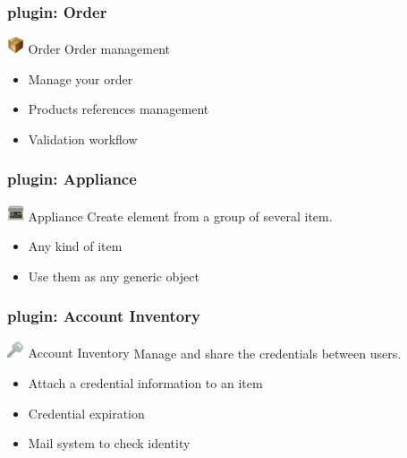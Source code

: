 \documentclass{beamer}
\begin{document}
\begin{frame}
    \frametitle{plugin: Order}

    \begin{block}{\includegraphics[height=0.5cm]{./pics/plugins/order.jpg} Order}
        Order management
        \begin{itemize}
            \item Manage your order
            \item Products references management
            \item Validation workflow
        \end{itemize}
    \end{block}

\end{frame}


\begin{frame}
    \frametitle{plugin: Appliance}

    \begin{block}{\includegraphics[height=0.5cm]{./pics/plugins/appliance.jpg} Appliance}
        Create element from a group of several item.
        \begin{itemize}
            \item Any kind of item
            \item Use them as any generic object
        \end{itemize}
    \end{block}

\end{frame}

\begin{frame}
    \frametitle{plugin: Account Inventory}

    \begin{block}{\includegraphics[height=0.5cm]{./pics/plugins/account.jpg} Account Inventory}
        Manage and share the credentials between users.
        \begin{itemize}
            \item Attach a credential information to an item
            \item Credential expiration
            \item Mail system to check identity
        \end{itemize}
    \end{block}

\end{frame}
\end{document}
